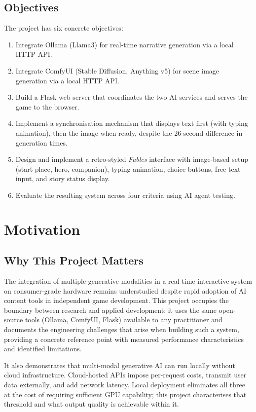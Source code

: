 \documentclass[12pt,a4paper]{article}
\begin{document}
    \subsection{Objectives}

The project has six concrete objectives:

\begin{enumerate}
    \item Integrate Ollama (Llama3) for real-time narrative generation via a local HTTP API.
    \item Integrate ComfyUI (Stable Diffusion, Anything v5) for scene image generation via a local HTTP API.
    \item Build a Flask web server that coordinates the two AI services and serves the game to the browser.
    \item Implement a synchronisation mechanism that displays text first (with typing animation), then the image when ready, despite the 26-second difference in generation times.
    \item Design and implement a retro-styled \textit{Fables} interface with image-based setup (start place, hero, companion), typing animation, choice buttons, free-text input, and story status display.
    \item Evaluate the resulting system across four criteria using AI agent testing.
\end{enumerate}

    \section{Motivation}

    \subsection{Why This Project Matters}

The integration of multiple generative modalities in a real-time interactive system on consumer-grade hardware remains understudied despite rapid adoption of AI content tools in independent game development. This project occupies the boundary between research and applied development: it uses the same open-source tools (Ollama, ComfyUI, Flask) available to any practitioner and documents the engineering challenges that arise when building such a system, providing a concrete reference point with measured performance characteristics and identified limitations.

It also demonstrates that multi-modal generative AI can run locally without cloud infrastructure. Cloud-hosted APIs impose per-request costs, transmit user data externally, and add network latency. Local deployment eliminates all three at the cost of requiring sufficient GPU capability; this project characterises that threshold and what output quality is achievable within it.
\end{document}
